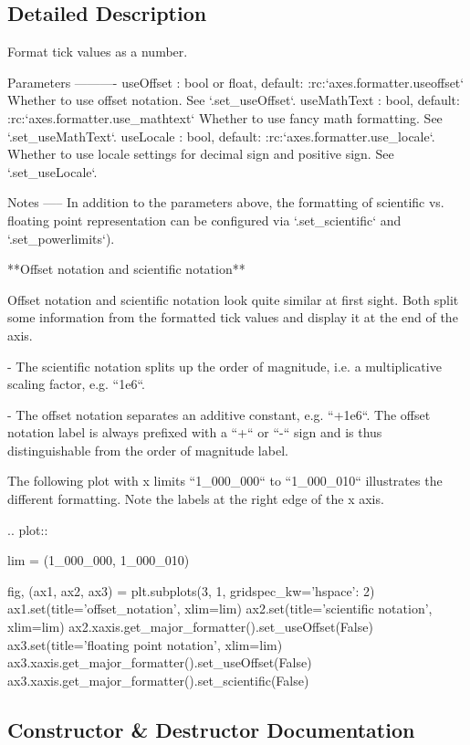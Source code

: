\subsection{Detailed Description}
\begin{DoxyVerb}Format tick values as a number.

Parameters
----------
useOffset : bool or float, default: :rc:`axes.formatter.useoffset`
    Whether to use offset notation. See `.set_useOffset`.
useMathText : bool, default: :rc:`axes.formatter.use_mathtext`
    Whether to use fancy math formatting. See `.set_useMathText`.
useLocale : bool, default: :rc:`axes.formatter.use_locale`.
    Whether to use locale settings for decimal sign and positive sign.
    See `.set_useLocale`.

Notes
-----
In addition to the parameters above, the formatting of scientific vs.
floating point representation can be configured via `.set_scientific`
and `.set_powerlimits`).

**Offset notation and scientific notation**

Offset notation and scientific notation look quite similar at first sight.
Both split some information from the formatted tick values and display it
at the end of the axis.

- The scientific notation splits up the order of magnitude, i.e. a
  multiplicative scaling factor, e.g. ``1e6``.

- The offset notation separates an additive constant, e.g. ``+1e6``. The
  offset notation label is always prefixed with a ``+`` or ``-`` sign
  and is thus distinguishable from the order of magnitude label.

The following plot with x limits ``1_000_000`` to ``1_000_010`` illustrates
the different formatting. Note the labels at the right edge of the x axis.

.. plot::

    lim = (1_000_000, 1_000_010)

    fig, (ax1, ax2, ax3) = plt.subplots(3, 1, gridspec_kw={'hspace': 2})
    ax1.set(title='offset_notation', xlim=lim)
    ax2.set(title='scientific notation', xlim=lim)
    ax2.xaxis.get_major_formatter().set_useOffset(False)
    ax3.set(title='floating point notation', xlim=lim)
    ax3.xaxis.get_major_formatter().set_useOffset(False)
    ax3.xaxis.get_major_formatter().set_scientific(False)\end{DoxyVerb}
 

\subsection{Constructor \& Destructor Documentation}
\mbox{\label{classmatplotlib_1_1ticker_1_1ScalarFormatter_ae077d4dee915b7095f71640d45a97473}} 
